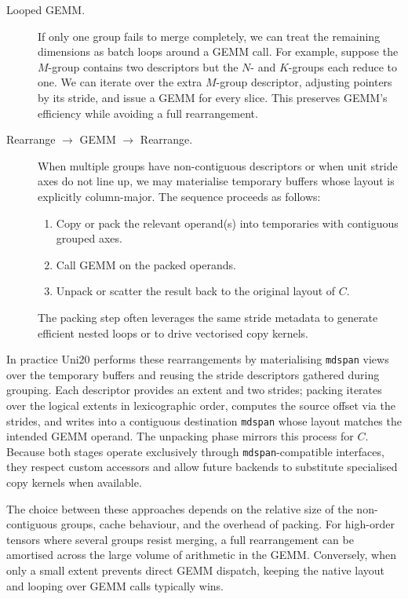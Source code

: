\documentclass[11pt]{article}
\begin{document}
\begin{description}
  \item[Looped GEMM.]  If only one group fails to merge completely, we can treat the remaining
        dimensions as batch loops around a GEMM call.  For example, suppose the $M$-group contains
        two descriptors but the $N$- and $K$-groups each reduce to one.  We can iterate over the
        extra $M$-group descriptor, adjusting pointers by its stride, and issue a GEMM for every
        slice.  This preserves GEMM's efficiency while avoiding a full rearrangement.
  \item[Rearrange $\rightarrow$ GEMM $\rightarrow$ Rearrange.]  When multiple groups have
        non-contiguous descriptors or when unit stride axes do not line up, we may materialise
        temporary buffers whose layout is explicitly column-major.  The sequence proceeds as follows:
        \begin{enumerate}
          \item Copy or pack the relevant operand(s) into temporaries with contiguous grouped axes.
          \item Call GEMM on the packed operands.
          \item Unpack or scatter the result back to the original layout of $C$.
        \end{enumerate}
        The packing step often leverages the same stride metadata to generate efficient nested loops
        or to drive vectorised copy kernels.
\end{description}

In practice Uni20 performs these rearrangements by materialising \texttt{mdspan} views over the
temporary buffers and reusing the stride descriptors gathered during grouping.  Each descriptor
provides an extent and two strides; packing iterates over the logical extents in lexicographic order,
computes the source offset via the strides, and writes into a contiguous destination \texttt{mdspan}
whose layout matches the intended GEMM operand.  The unpacking phase mirrors this process for $C$.
Because both stages operate exclusively through \texttt{mdspan}-compatible interfaces, they respect
custom accessors and allow future backends to substitute specialised copy kernels when available.

The choice between these approaches depends on the relative size of the non-contiguous groups,
cache behaviour, and the overhead of packing.  For high-order tensors where several groups resist
merging, a full rearrangement can be amortised across the large volume of arithmetic in the GEMM.
Conversely, when only a small extent prevents direct GEMM dispatch, keeping the native layout and
looping over GEMM calls typically wins.
\end{document}
